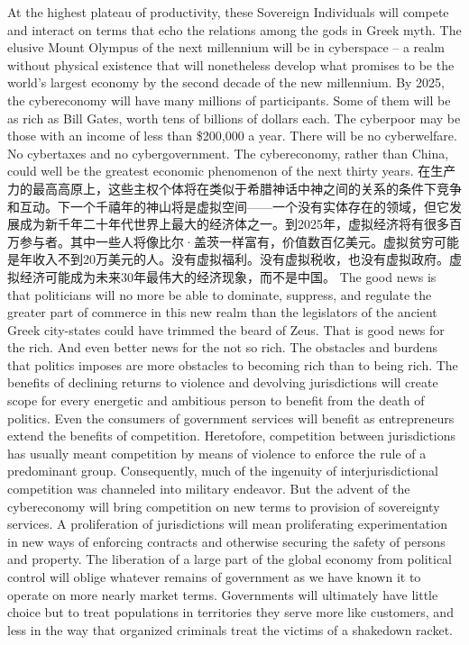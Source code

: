 \begin{paracol}{2}[]
\switchcolumn*
At the highest plateau of productivity, these Sovereign Individuals will compete and interact on terms that echo the relations among the gods in Greek myth. The elusive Mount Olympus of the next millennium will be in cyberspace -- a realm without physical existence that will nonetheless develop what promises to be the world's largest economy by the second decade of the new millennium. By 2025, the cybereconomy will have many millions of participants. Some of them will be as rich as Bill Gates, worth tens of billions of dollars each. The cyberpoor may be those with an income of less than \$200,000 a year. There will be no cyberwelfare. No cybertaxes and no cybergovernment. The cybereconomy, rather than China, could well be the greatest economic phenomenon of the next thirty years.
\switchcolumn
在生产力的最高高原上，这些主权个体将在类似于希腊神话中神之间的关系的条件下竞争和互动。下一个千禧年的神山将是虚拟空间——一个没有实体存在的领域，但它发展成为新千年二十年代世界上最大的经济体之一。到2025年，虚拟经济将有很多百万参与者。其中一些人将像比尔·盖茨一样富有，价值数百亿美元。虚拟贫穷可能是年收入不到20万美元的人。没有虚拟福利。没有虚拟税收，也没有虚拟政府。虚拟经济可能成为未来30年最伟大的经济现象，而不是中国。
\switchcolumn*
The good news is that politicians will no more be able to dominate, suppress, and regulate the greater part of commerce in this new realm than the legislators of the ancient Greek city-states could have trimmed the beard of Zeus. That is good news for the rich. And even better news for the not so rich. The obstacles and burdens that politics imposes are more obstacles to becoming rich than to being rich.    The benefits of declining returns to violence and devolving jurisdictions will create scope for every energetic and ambitious person to benefit from the death of politics. Even the consumers of government services will benefit as entrepreneurs extend the benefits of competition. Heretofore, competition between jurisdictions has usually meant competition by means of violence to enforce the rule of a predominant group. Consequently, much of the ingenuity of interjurisdictional competition was channeled into military endeavor. But the advent of the cybereconomy will bring competition on new terms to provision of sovereignty services. A proliferation of jurisdictions will mean proliferating experimentation in new ways of enforcing contracts and otherwise securing the safety of persons and property. The liberation of a large part of the global economy from political control will oblige whatever remains of government as we have known it to operate on more nearly market terms. Governments will ultimately have little choice but to treat populations in territories they serve more like customers, and less in the way that organized criminals treat the victims of a shakedown racket.

\end{paracol}
